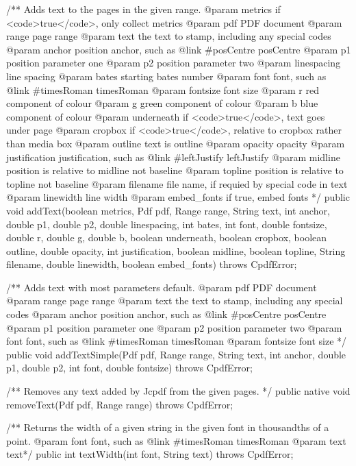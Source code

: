 /** Adds text to the pages in the given range.
@param metrics if <code>true</code>, only collect metrics
@param pdf PDF document
@param range page range
@param text the text to stamp, including any special codes
@param anchor position anchor, such as {@link #posCentre posCentre}
@param p1 position parameter one
@param p2 position parameter two
@param linespacing line spacing
@param bates starting bates number
@param font font, such as {@link #timesRoman timesRoman}
@param fontsize font size
@param r red component of colour
@param g green component of colour
@param b blue component of colour
@param underneath if <code>true</code>, text goes under page
@param cropbox if <code>true</code>,
relative to cropbox rather than media box
@param outline text is outline
@param opacity opacity
@param justification justification,
such as {@link #leftJustify leftJustify}
@param midline position is relative to midline not baseline
@param topline position is relative to topline not baseline
@param filename file name, if requied by special code in text
@param linewidth line width
@param embed_fonts if true, embed fonts
*/
public void addText(boolean metrics, Pdf pdf, Range range, String text,
                    int anchor, double p1, double p2, double linespacing,
                    int bates, int font, double fontsize, double r,
                    double g, double b, boolean underneath,
                    boolean cropbox, boolean outline, double opacity,
                    int justification, boolean midline, boolean topline,
                    String filename, double linewidth, boolean embed_fonts)
    throws CpdfError;

/** Adds text with most parameters default.
@param pdf PDF document
@param range page range
@param text the text to stamp, including any special codes
@param anchor position anchor, such as {@link #posCentre posCentre}
@param p1 position parameter one
@param p2 position parameter two
@param font font, such as {@link #timesRoman timesRoman}
@param fontsize font size
*/
public void addTextSimple(Pdf pdf, Range range, String text, int anchor,
                          double p1, double p2, int font, double fontsize)
    throws CpdfError;

/** Removes any text added by Jcpdf from the given pages. */
public native void removeText(Pdf pdf, Range range) throws CpdfError;

/** Returns the width of a given string in the given font in thousandths of
a point.
@param font font, such as {@link #timesRoman timesRoman}
@param text text*/
public int textWidth(int font, String text) throws CpdfError;

